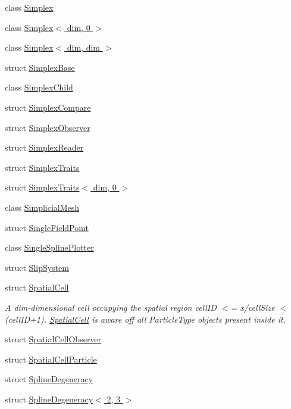 \begin{DoxyCompactItemize}
class \hyperlink{classmodel_1_1_simplex}{Simplex}
\item 
class \hyperlink{classmodel_1_1_simplex_3_01dim_00_010_01_4}{Simplex$<$ dim, 0 $>$}
\item 
class \hyperlink{classmodel_1_1_simplex_3_01dim_00_01dim_01_4}{Simplex$<$ dim, dim $>$}
\item 
struct \hyperlink{structmodel_1_1_simplex_base}{Simplex\+Base}
\item 
class \hyperlink{classmodel_1_1_simplex_child}{Simplex\+Child}
\item 
struct \hyperlink{structmodel_1_1_simplex_compare}{Simplex\+Compare}
\item 
struct \hyperlink{structmodel_1_1_simplex_observer}{Simplex\+Observer}
\item 
struct \hyperlink{structmodel_1_1_simplex_reader}{Simplex\+Reader}
\item 
struct \hyperlink{structmodel_1_1_simplex_traits}{Simplex\+Traits}
\item 
struct \hyperlink{structmodel_1_1_simplex_traits_3_01dim_00_010_01_4}{Simplex\+Traits$<$ dim, 0 $>$}
\item 
class \hyperlink{classmodel_1_1_simplicial_mesh}{Simplicial\+Mesh}
\item 
struct \hyperlink{structmodel_1_1_single_field_point}{Single\+Field\+Point}
\item 
class \hyperlink{classmodel_1_1_single_spline_plotter}{Single\+Spline\+Plotter}
\item 
struct \hyperlink{structmodel_1_1_slip_system}{Slip\+System}
\item 
struct \hyperlink{structmodel_1_1_spatial_cell}{Spatial\+Cell}
\begin{DoxyCompactList}\small\item\em A dim-\/dimensional cell occupying the spatial region cell\+I\+D $<$= x/cell\+Size $<$ (cell\+I\+D+1). \hyperlink{structmodel_1_1_spatial_cell}{Spatial\+Cell} is aware off all Particle\+Type objects present inside it. \end{DoxyCompactList}\item 
struct \hyperlink{structmodel_1_1_spatial_cell_observer}{Spatial\+Cell\+Observer}
\item 
struct \hyperlink{structmodel_1_1_spatial_cell_particle}{Spatial\+Cell\+Particle}
\item 
struct \hyperlink{structmodel_1_1_spline_degeneracy}{Spline\+Degeneracy}
\item 
struct \hyperlink{structmodel_1_1_spline_degeneracy_3_012_00_013_01_4}{Spline\+Degeneracy$<$ 2, 3 $>$}

\end{DoxyCompactItemize}

